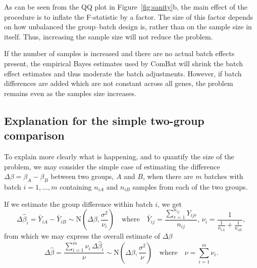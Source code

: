 \documentclass[oupdraft]{bio}
\begin{document}
As can be seen from the QQ plot in Figure~\ref{fig:sanity}b, the main effect of the procedure is to inflate the F-statistic by a factor. The size of this factor depends on how unbalanced the group--batch design is, rather than on the sample size in itself. Thus, increasing the sample size will not reduce the problem.

If the number of samples is increased and there are no actual batch effects present, the empirical Bayes estimates used by ComBat will shrink the batch effect estimates and thus moderate the batch adjustments. However, if batch differences are added which are not constant across all genes, the problem remains even as the samples size increases.

\subsection{Explanation for the simple two-group comparison}
\label{sec:twogroups}

To explain more clearly what is happening, and to quantify the size of the problem, we may consider the simple case of estimating the difference $\Delta\beta=\beta_A-\beta_B$ between two groups, $A$ and $B$, when there are $m$ batches with batch $i=1,\ldots,m$ containing $n_{iA}$ and $n_{iB}$ samples from each of the two groups.

If we estimate the group difference within batch $i$, we get
\begin{equation}
\Delta\hat{\beta}_i=\bar{Y}_{iA}-\bar{Y}_{iB}\sim\text{N}\left(\Delta\beta,\frac{\sigma^2}{\nu_i}\right)
\quad\text{where}\quad
\bar{Y}_{ij}=\frac{\sum_{r=1}^{n_{ij}}Y_{ijr}}{n_{ij}},\,
\nu_i=\frac{1}{\frac{1}{n_{iA}}+\frac{1}{n_{iB}}},
\end{equation}
from which we may express the overall estimate of $\Delta\beta$
\begin{equation}
\Delta\hat{\beta}=\frac{\sum_{i=1}^m \nu_i\,\Delta\hat{\beta}_i}{\nu}
\sim\text{N}\left(\Delta\beta,\frac{\sigma^2}{\nu}\right)
\quad\text{where}\quad
\nu=\sum_{i=1}^m\nu_i.
\end{equation}
\end{document}
